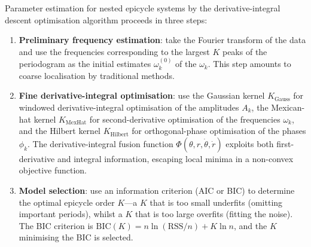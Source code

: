 \begin{proposition}\label{prop:kdi_parameter_estimation}
Parameter estimation for nested epicycle systems by the derivative-integral descent optimisation algorithm proceeds in three steps:
\begin{enumerate}[label=(\roman*)]
    \item \textbf{Preliminary frequency estimation}: take the Fourier transform of the data and use the frequencies corresponding to the largest $K$ peaks of the periodogram as the initial estimates $\omega_k^{(0)}$ of the $\omega_k$. This step amounts to coarse localisation by traditional methods.
    \item \textbf{Fine derivative-integral optimisation}: use the Gaussian kernel $K_{\text{Gauss}}$ for windowed derivative-integral optimisation of the amplitudes $A_k$, the Mexican-hat kernel $K_{\text{MexHat}}$ for second-derivative optimisation of the frequencies $\omega_k$, and the Hilbert kernel $K_{\text{Hilbert}}$ for orthogonal-phase optimisation of the phases $\phi_k$. The derivative-integral fusion function $\Phi(\theta, r, \dot{\theta}, \dot{r})$ exploits both first-derivative and integral information, escaping local minima in a non-convex objective function.
    \item \textbf{Model selection}: use an information criterion (AIC or BIC) to determine the optimal epicycle order $K$---a $K$ that is too small underfits (omitting important periods), whilst a $K$ that is too large overfits (fitting the noise). The BIC criterion is $\text{BIC}(K) = n\ln(\text{RSS}/n) + K\ln n$, and the $K$ minimising the BIC is selected.
\end{enumerate}
\end{proposition}

